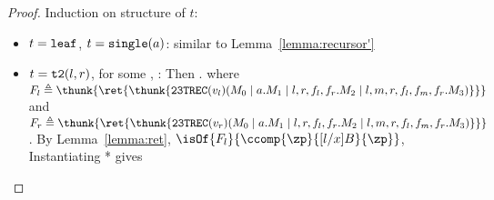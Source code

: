 \begin{proof}
Induction on structure of $t$:
  \begin{itemize}
    \item $t = \mathtt{leaf}$, $t = \mathtt{single}(a)$: similar to Lemma~\ref{lemma:recursor'}
    \item $t = \mathtt{t2}(l,r)$, for some , :
      Then . 
      where $F_l \triangleq \thunk{\ret{\thunk{\ttrec{v_l}{M_0}{a}{M_1}{l,r,f_l,f_r}{M_2}{l,m,r,f_l,f_m,f_r}{M_3}}}}$ 
      and $F_r \triangleq \thunk{\ret{\thunk{\ttrec{v_r}{M_0}{a}{M_1}{l,r,f_l,f_r}{M_2}{l,m,r,f_l,f_m,f_r}{M_3}}}}$. 
      By Lemma~\ref{lemma:ret}, $\isOf{F_l}{\ccomp{\zp}{[l/x]B}{\zp}}$,
      Instantiating * gives 

  \end{itemize}
\end{proof}

\fi

